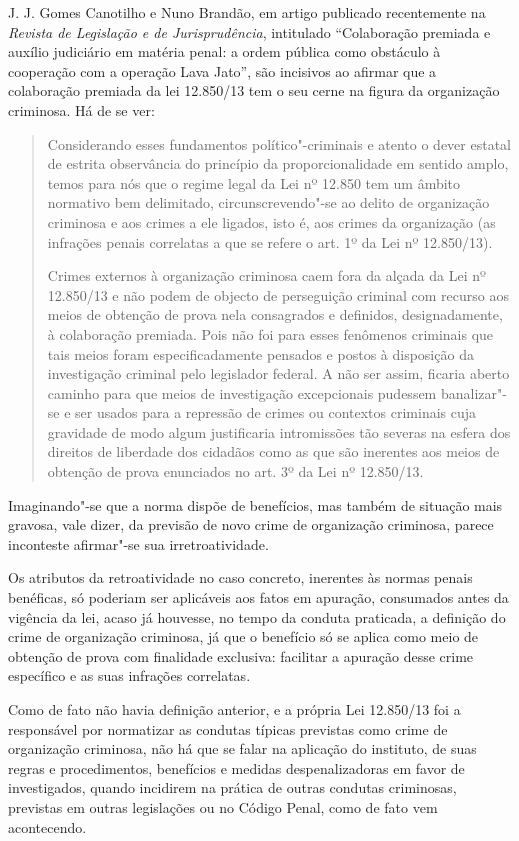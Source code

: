 J. J. Gomes Canotilho e Nuno Brandão, em artigo publicado recentemente
na \emph{Revista de Legislação e de Jurisprudência}, intitulado ``Colaboração
premiada e auxílio judiciário em matéria penal: a ordem pública como
obstáculo à cooperação com a operação Lava Jato'', são incisivos ao
afirmar que a colaboração premiada da lei 12.850/13 tem o seu cerne na
figura da organização criminosa. Há de se ver:

\begin{quote}
Considerando esses fundamentos político"-criminais e atento o
dever estatal de estrita observância do princípio da proporcionalidade
em sentido amplo, temos para nós que o regime legal da Lei nº 12.850 tem
um âmbito normativo bem delimitado, circunscrevendo"-se ao delito de
organização criminosa e aos crimes a ele ligados, isto é, aos crimes da
organização (as infrações penais correlatas a que se refere o art. 1º da
Lei nº 12.850/13).

\noindent Crimes externos à organização criminosa caem fora da alçada da Lei
nº 12.850/13 e não podem de objecto de perseguição criminal com recurso
aos meios de obtenção de prova nela consagrados e definidos,
designadamente, à colaboração premiada. Pois não foi para esses
fenômenos criminais que tais meios foram especificadamente pensados e
postos à disposição da investigação criminal pelo legislador federal. A
não ser assim, ficaria aberto caminho para que meios de investigação
excepcionais pudessem banalizar"-se e ser usados para a repressão de
crimes ou contextos criminais cuja gravidade de modo algum justificaria
intromissões tão severas na esfera dos direitos de liberdade dos
cidadãos como as que são inerentes aos meios de obtenção de prova
enunciados no art. 3º da Lei nº 12.850/13.
\end{quote}

Imaginando"-se que a norma dispõe de benefícios, mas também de situação
mais gravosa, vale dizer, da previsão de novo crime de organização
criminosa, parece inconteste afirmar"-se sua irretroatividade.

Os atributos da retroatividade no caso concreto, inerentes às normas
penais benéficas, só poderiam ser aplicáveis aos fatos em apuração,
consumados antes da vigência da lei, acaso já houvesse, no tempo da
conduta praticada, a definição do crime de organização criminosa, já que
o benefício só se aplica como meio de obtenção de prova com finalidade
exclusiva: facilitar a apuração desse crime específico e as suas
infrações correlatas.

Como de fato não havia definição anterior, e a própria Lei 12.850/13 foi
a responsável por normatizar as condutas típicas previstas como crime de
organização criminosa, não há que se falar na aplicação do instituto, de
suas regras e procedimentos, benefícios e medidas despenalizadoras em
favor de investigados, quando incidirem na prática de outras condutas
criminosas, previstas em outras legislações ou no Código Penal, como de
fato vem acontecendo.

